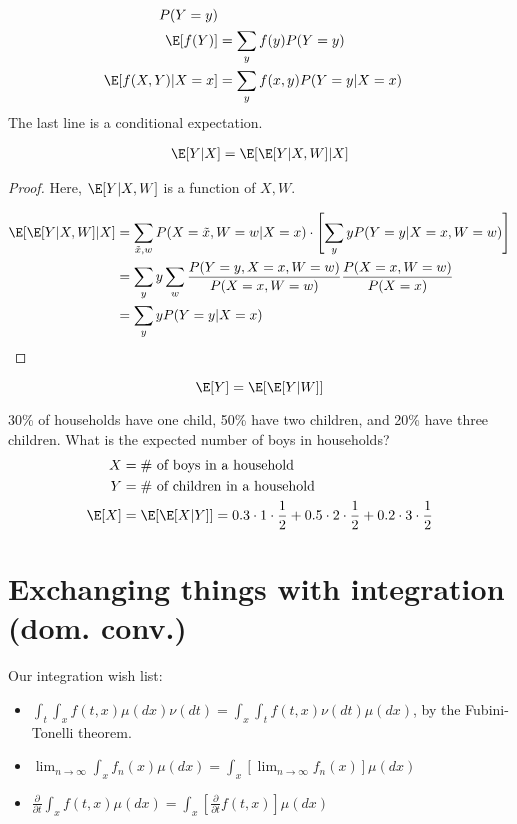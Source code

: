 \documentclass[twoside]{article}
\begin{document}
\begin{align*}
  P(Y = y) \\
  \E[f(Y)] &= \sum_y f(y) P(Y = y) \\
  \E[f(X, Y) | X = x] &= \sum_y f(x, y) P(Y = y | X = x)
\end{align*}
The last line is a conditional expectation.

\begin{theorem}
\begin{align*}
  \E[Y | X] = \E[\E[Y | X, W] | X]
\end{align*}
\end{theorem}
\begin{proof}
  Here, $\E[Y | X, W]$ is a function of $X, W$. 

  \begin{align*}
    \E[\E[Y | X, W] | X] &= \sum_{\tilde{x}, w} P(X = \tilde{x}, W = w | X = x)
    \cdot \left[ \sum_y yP(Y = y | X = x, W = w)\right] \\
    &= \sum_y y \sum_w \frac{P(Y = y, X = x, W = w)}{P(X = x, W = w)}  \frac{P(X =
    x, W = w)}{P(X = x)} \\
    &= \sum_y y P(Y = y | X = x)
  \end{align*}
\end{proof}
\begin{corollary}
  \[\E[Y] = \E[\E[Y | W]]\]
\end{corollary}

\begin{example}
30\% of households have one child, 50\% have two children, and 20\% have
three children. What is the expected number of boys in households?
\begin{align*}
  X &= \text{\# of boys in a household} \\
  Y &= \text{\# of children in a household} \\
  \E[X] &= \E[\E[X | Y]]= 0.3 \cdot 1 \cdot \frac{1}{2} + 0.5 \cdot 2 \cdot
  \frac{1}{2} + 0.2 \cdot 3 \cdot \frac{1}{2}
\end{align*}
\end{example}

\section{Exchanging things with integration (dom. conv.)}

Our integration wish list:
\begin{itemize}
  \item $\int_t \int_x f(t, x) \mu(dx) \nu(dt) = \int_x \int_t f(t, x) \nu(dt)
    \mu(dx)$, by the Fubini-Tonelli theorem.
  \item $\lim_{n \rightarrow \infty} \int_x f_n(x) \mu(dx) = \int_x \left[
    \lim_{n \rightarrow \infty} f_n(x) \right] \mu(dx)$
  \item $\frac{\partial}{\partial t} \int_x f(t, x) \mu(dx) = \int_x
    \left[\frac{\partial}{\partial t} f(t, x)\right] \mu(dx)$
\end{itemize}
\end{document}
